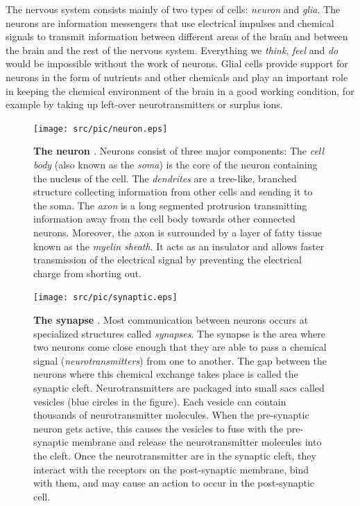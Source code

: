 The nervous system consists mainly of two types of cells: \emph{neuron} and \emph{glia}. The neurons are information messengers that use electrical impulses and chemical signals to transmit information between different areas of the brain and between the brain and the rest of the nervous system. Everything we \emph{think}, \emph{feel} and \emph{do} would be impossible without the work of neurons. Glial cells provide support for neurons in the form of nutrients and other chemicals and play an important role in keeping the chemical environment of the brain in a good working condition, for example by taking up left-over neurotransmitters or surplus ions.

\begin{figure}[ht!]
  \centering
  \texttt{[image: src/pic/neuron.eps]}
  \caption{\textbf{The neuron \cite[taken from][]{introductiontopsychology}}. Neurons consist of three major components: The \emph{cell body} (also known as the \emph{soma}) is the core of the neuron containing the nucleus of the cell. The \emph{dendrites} are a tree-like, branched structure collecting information from other cells and sending it to the soma. The \emph{axon} is a long segmented protrusion transmitting information away from the cell body towards other connected neurons. Moreover, the axon is surrounded by a layer of fatty tissue known as the \emph{myelin sheath}. It acts as an insulator and allows faster transmission of the electrical signal by preventing the electrical charge from shorting out.}
  \label{fig:neuron}
\end{figure}

\begin{figure}[ht!]
  \centering
  \texttt{[image: src/pic/synaptic.eps]}
  \caption{\textbf{The synapse \citep[taken from][]{Neurotransmitters}}. Most communication between neurons occurs at specialized structures called \emph{synapses}. The synapse is the area where two neurons come close enough that they are able to pass a chemical signal (\emph{neurotransmitters}) from one to another. The gap between the neurons where this chemical exchange takes place is called the synaptic cleft. Neurotransmitters are packaged into small sacs called vesicles (blue circles in the figure). Each vesicle can contain thousands of neurotransmitter molecules. When the pre-synaptic neuron gets active, this causes the vesicles to fuse with the pre-synaptic membrane and release the neurotransmitter molecules into the cleft. Once the neurotransmitter are in the synaptic cleft, they interact with the receptors on the post-synaptic membrane, bind with them, and may cause an action to occur in the post-synaptic cell.}
  \label{fig:synapse}
\end{figure}

